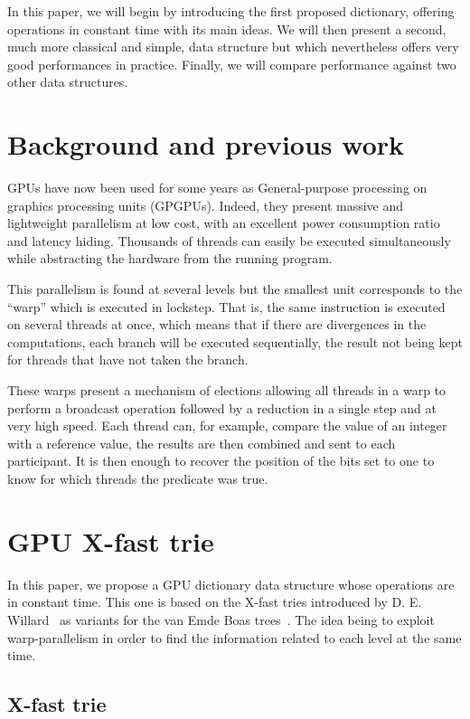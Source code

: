 \documentclass[conference]{IEEEtran}
\begin{document}
In this paper, we will begin by introducing the first proposed dictionary, offering operations in constant time with its main ideas. We will then present a second, much more classical and simple, data structure but which nevertheless offers very good performances in practice. Finally, we will compare performance against two other data structures.

\section{Background and previous work}

GPUs have now been used for some years as General-purpose processing on graphics processing units (GPGPUs). Indeed, they present massive and lightweight parallelism at low cost, with an excellent power consumption ratio and latency hiding. Thousands of threads can easily be executed simultaneously while abstracting the hardware from the running program.

This parallelism is found at several levels but the smallest unit corresponds to the ``warp'' which is executed in lockstep. That is, the same instruction is executed on several threads at once, which means that if there are divergences in the computations, each branch will be executed sequentially, the result not being kept for threads that have not taken the branch.

These warps present a mechanism of elections allowing all threads in a warp to perform a broadcast operation followed by a reduction in a single step and at very high speed. Each thread can, for example, compare the value of an integer with a reference value, the results are then combined and sent to each participant. It is then enough to recover the position of the bits set to one to know for which threads the predicate was true.

\section{GPU X-fast trie}

In this paper, we propose a GPU dictionary data structure whose operations are in constant time. This one is based on the X-fast tries introduced by D. E. Willard~\cite{willard1983log} as variants for the van Emde Boas trees~\cite{van1975preserving}. The idea being to exploit warp-parallelism in order to find the information related to each level at the same time.

\subsection{X-fast trie}
\end{document}
